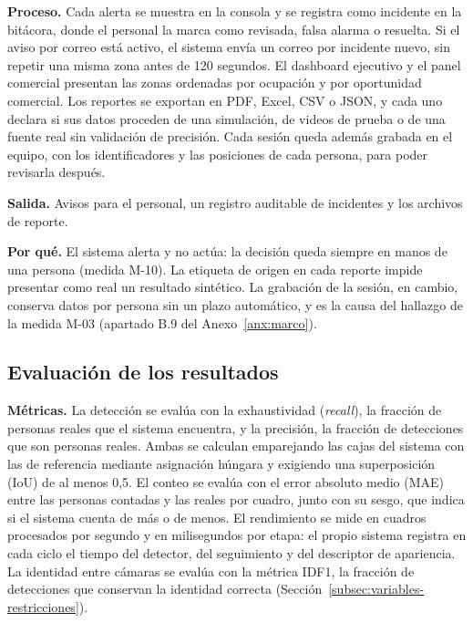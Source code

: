 \textbf{Proceso.} Cada alerta se muestra en la consola y se registra como incidente en la
bitácora, donde el personal la marca como revisada, falsa alarma o resuelta. Si el aviso por
correo está activo, el sistema envía un correo por incidente nuevo, sin repetir una misma zona
antes de 120 segundos. El dashboard ejecutivo y el panel comercial presentan las zonas
ordenadas por ocupación y por oportunidad comercial. Los reportes se exportan en PDF, Excel,
CSV o JSON, y cada uno declara si sus datos proceden de una simulación, de videos de prueba o
de una fuente real sin validación de precisión. Cada sesión queda además grabada en el equipo,
con los identificadores y las posiciones de cada persona, para poder revisarla después.

\textbf{Salida.} Avisos para el personal, un registro auditable de incidentes y los archivos de
reporte.

\textbf{Por qué.} El sistema alerta y no actúa: la decisión queda siempre en manos de una
persona (medida M-10). La etiqueta de origen en cada reporte impide presentar como real un
resultado sintético. La grabación de la sesión, en cambio, conserva datos por persona sin un
plazo automático, y es la causa del hallazgo de la medida M-03 (apartado B.9 del
Anexo~\ref{anx:marco}).

\subsection{Evaluación de los resultados}
\label{subsec:met-evaluacion}

\textbf{Métricas.} La detección se evalúa con la exhaustividad (\emph{recall}), la fracción de
personas reales que el sistema encuentra, y la precisión, la fracción de detecciones que son
personas reales. Ambas se calculan emparejando las cajas del sistema con las de referencia
mediante asignación húngara y exigiendo una superposición (IoU) de al menos 0,5. El conteo se
evalúa con el error absoluto medio (MAE) entre las personas contadas y las reales por cuadro,
junto con su sesgo, que indica si el sistema cuenta de más o de menos. El rendimiento se mide
en cuadros procesados por segundo y en milisegundos por etapa: el propio sistema registra en
cada ciclo el tiempo del detector, del seguimiento y del descriptor de apariencia. La identidad
entre cámaras se evalúa con la métrica IDF1, la fracción de detecciones que conservan la
identidad correcta (Sección~\ref{subsec:variables-restricciones}).

